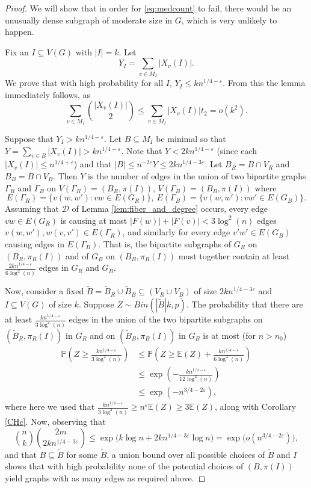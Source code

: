 \documentclass{article}
\newcommand{\p}{\mathbb{P}}
\newcommand{\e}{\mathbb{E}}
\begin{document}
\begin{proof} 

We will show that in order for \eqref{eq:medcount} to fail, there would be an unusually dense subgraph of moderate size in $G$, which is very unlikely to happen.


Fix an $I \subseteq V(G)$ with $|I| = k$. Let \[
Y_I =\sum_{v \in M_I}|X_v(I)|.\]
We prove that with high probability for all $I$, $Y_I \leq kn^{1/4-\varepsilon}.$  From this the lemma immediately follows, as 
\[
\sum_{v \in M_I} \binom {|X_v(I)|}{2} \leq  \sum_{v \in M_I} |X_v(I)|t_2 = o(k^2).
\]


Suppose that $Y_I > kn^{1/4 - \varepsilon}.$  Let $B \subseteq M_I$ be minimal so that $Y = \sum_{v \in B} |X_v(I)| > kn^{1/4 - \varepsilon}$.  Note that $Y < 2kn^{1/4 - \varepsilon}$ (since each $|X_v(I)| \leq n^{1/4 + \varepsilon}$) and that $|B| \leq n^{-2\varepsilon}Y \leq  2kn^{1/4 - 3\varepsilon}.$  Let $B_R=B\cap V_R$ and $B_B=B\cap V_B$. Then $Y$ is the number of edges in the union of two bipartite graphs $\Gamma_R$ and $\Gamma_B$ on $V(\Gamma_R)=(B_R,\pi(I))$, $V(\Gamma_B)=(B_B,\pi(I))$ where 
\[
E(\Gamma_R)=\{v(w,w'):vw \in E(G_R)\},~E(\Gamma_B)=\{v(w,w'):vw' \in E(G_B)\}.
\]
Assuming that $\mathcal{D}$ of Lemma \ref{lem:fiber_and_degree} occurs, every edge $vw\in E(G_R)$ is causing at most 
$|F(w)|+|F(v)|<3\log^2(n)$ edges $v(w,w'),w(v,v') \in E(\Gamma_R)$, and similarly for every edge $v'w'\in E(G_B)$ causing edges in $E(\Gamma_B)$.  That is, the bipartite subgraphs of $G_R$ on $(B_R, \pi_R(I))$ and of $G_B$ on $(B_B, \pi_R(I))$ 
must together contain at least $\frac{2kn^{1/4 - \varepsilon}}{6\log^2(n)}$ edges in $G_R$ and $G_B$. 

Now, consider a fixed $\tilde{B} =\tilde{B}_R\cup \tilde{B}_B\subseteq (V_R \cup V_B)$ of size $2kn^{1/4-3\varepsilon}$ and $I \subseteq V(G)$ of size $k$.  Suppose $Z \sim Bin(|\tilde{B}|k,p)$.  The probability that there are at least $\frac{kn^{1/4 - \varepsilon}}{3\log^2(n)}$ edges in the union of the two bipartite subgraphs on $(\tilde{B}_R,\pi_R(I))$ in $G_R$ and on $(\tilde{B}_B,\pi_B(I))$ in $G_B$ is at most (for $n>n_0$)
\begin{align*}
\p\left(Z \geq \frac{kn^{1/4 - \varepsilon}}{3\log^2(n)}   \right) &\leq \p\left( Z \geq \e(Z) + \frac{kn^{1/4 - \varepsilon}}{6\log^2(n)} \right) \\
& \leq \exp\left( - \frac{kn^{1/4 - \varepsilon}}{12\log^2(n)}  \right)\\
& \leq \exp\left(-n^{3/4-2\varepsilon} \right),
\end{align*} 
where here we used that $\frac{kn^{1/4 - \varepsilon}}{3\log^2(n)} \geq n^\varepsilon\e(Z)\ge  3\e(Z)$, along with Corollary \ref{CHc}.  Now, observing that
\[
\binom{n}{k}\binom{2{m}}{2kn^{1/4 - 3\varepsilon}} \leq \exp\big( k \log n + 2kn^{1/4-3\varepsilon} \log n \big)= \exp\big(o(n^{3/4-2\varepsilon})\big),
\]
and that $B\subseteq \tilde{B}$ for some $\tilde B$, a union bound over all possible choices of $\tilde{B}$ and $I$ shows that with high probability none of the potential choices of $(B,\pi(I))$ yield graphs with as many edges as required above. 


\end{proof}
\end{document}
